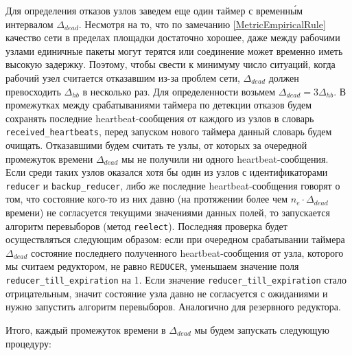 \documentclass{article}
\theoremstyle{plain}
\theoremstyle{plain}
\theoremstyle{plain}
\theoremstyle{plain}
\theoremstyle{definition}
\theoremstyle{remark}
\theoremstyle{plain}
\begin{document}
Для определения отказов узлов заведем еще один таймер с временн\'{ы}м интервалом $\Delta_{dead}$. Несмотря на то, что по замечанию \ref{MetricEmpiricalRule} качество сети в пределах площадки достаточно хорошее, даже между рабочими узлами единичные пакеты могут терятся или соединение может временно иметь высокую задержку. Поэтому, чтобы свести к минимуму число ситуаций, когда рабочий узел считается отказавшим из-за проблем сети, $\Delta_{dead}$ должен превосходить $\Delta_{hb}$ в несколько раз. Для определенности возьмем $\Delta_{dead} = 3\Delta_{hb}$. В промежутках между срабатываниями таймера по детекции отказов будем сохранять последние heartbeat-со\-об\-ще\-ния от каждого из узлов в словарь \texttt{re\-cei\-ved\_heart\-beats}, перед запуском нового таймера данный словарь будем очищать. Отказавшими будем считать те узлы, от которых за очередной промежуток времени $\Delta_{dead}$ мы не получили ни одного heartbeat-со\-об\-ще\-ния. Если среди таких узлов оказался хотя бы один из узлов с идентификаторами \texttt{reducer} и \texttt{backup\_reducer}, либо же последние heartbeat-со\-об\-ще\-ния говорят о том, что состояние кого-то из них давно (на протяжении более чем $n_e \cdot \Delta_{dead}$ времени) не согласуется текущими значениями данных полей, то запускается алгоритм перевыборов (метод \texttt{reelect}). Последняя проверка будет осуществляться следующим образом: если при очередном срабатывании таймера $\Delta_{dead}$ состояние последнего полученного heartbeat-со\-об\-ще\-ния от узла, которого мы считаем редуктором, не равно \texttt{REDUCER}, уменьшаем значение поля \texttt{reducer\_till\_expiration} на 1. Если значение \texttt{reducer\_till\_expiration} стало отрицательным, значит состояние узла давно не согласуется с ожиданиями и нужно запустить алгоритм перевыборов. Аналогично для резервного редуктора.

Итого, каждый промежуток времени в $\Delta_{dead}$ мы будем запускать следующую процедуру:
\end{document}
